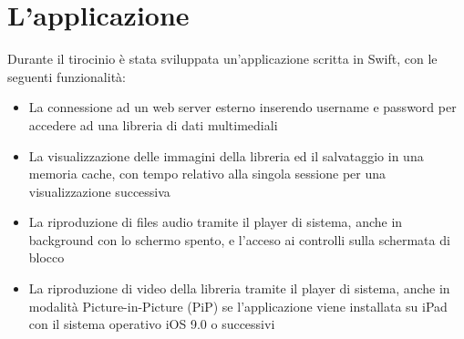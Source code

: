 \chapter{L'applicazione}
Durante il tirocinio è stata sviluppata un'applicazione scritta in Swift, con le seguenti funzionalità:
\begin{itemize}
\item La connessione ad un web server esterno inserendo username e password per accedere ad una libreria di dati multimediali
\item La visualizzazione delle immagini della libreria ed il salvataggio in una memoria cache, con tempo relativo alla singola sessione per una visualizzazione successiva
\item La riproduzione di files audio tramite il player di sistema, anche in background con lo schermo spento, e l'acceso ai controlli sulla schermata di blocco
\item La riproduzione di video della libreria tramite il player di sistema, anche in modalità Picture-in-Picture (PiP) se l'applicazione viene installata su iPad con il sistema operativo iOS 9.0 o successivi
\end{itemize}

